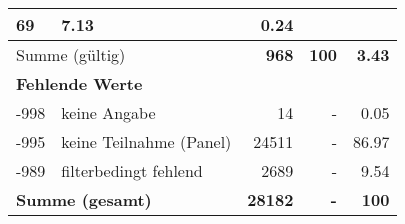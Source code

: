 \begin{longtable}{lXrrr}
       \num{69} &
       \num[round-mode=places,round-precision=2]{7.13} &
         \num[round-mode=places,round-precision=2]{0.24} \\
     \midrule
     \multicolumn{2}{l}{Summe (gültig)} &
       \textbf{\num{968}} &
     \textbf{\num{100}} &
       \textbf{\num[round-mode=places,round-precision=2]{3.43}} \\
     \multicolumn{5}{l}{\textbf{Fehlende Werte}}\\
       -998 &
       keine Angabe &
         \num{14} &
        - &
         \num[round-mode=places,round-precision=2]{0.05} \\
       -995 &
       keine Teilnahme (Panel) &
         \num{24511} &
        - &
         \num[round-mode=places,round-precision=2]{86.97} \\
       -989 &
       filterbedingt fehlend &
         \num{2689} &
        - &
         \num[round-mode=places,round-precision=2]{9.54} \\
     \midrule
     \multicolumn{2}{l}{\textbf{Summe (gesamt)}} &
          \textbf{\num{28182}} &
        \textbf{-} &
        \textbf{\num{100}} \\
     \bottomrule
     \end{longtable}
     
